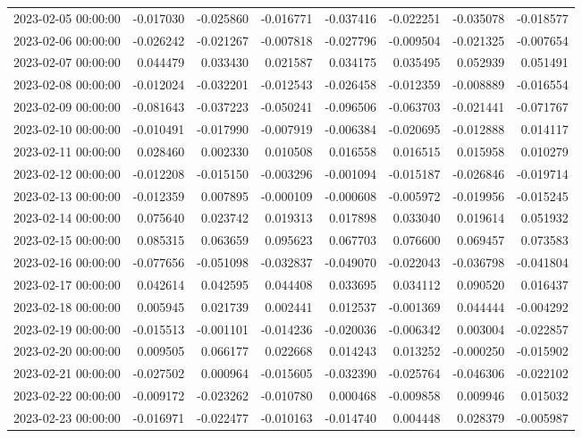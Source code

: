 \begin{tabular}{lrrrrrrr}
2023-02-05 00:00:00 & -0.017030 & -0.025860 & -0.016771 & -0.037416 & -0.022251 & -0.035078 & -0.018577 \\
2023-02-06 00:00:00 & -0.026242 & -0.021267 & -0.007818 & -0.027796 & -0.009504 & -0.021325 & -0.007654 \\
2023-02-07 00:00:00 & 0.044479 & 0.033430 & 0.021587 & 0.034175 & 0.035495 & 0.052939 & 0.051491 \\
2023-02-08 00:00:00 & -0.012024 & -0.032201 & -0.012543 & -0.026458 & -0.012359 & -0.008889 & -0.016554 \\
2023-02-09 00:00:00 & -0.081643 & -0.037223 & -0.050241 & -0.096506 & -0.063703 & -0.021441 & -0.071767 \\
2023-02-10 00:00:00 & -0.010491 & -0.017990 & -0.007919 & -0.006384 & -0.020695 & -0.012888 & 0.014117 \\
2023-02-11 00:00:00 & 0.028460 & 0.002330 & 0.010508 & 0.016558 & 0.016515 & 0.015958 & 0.010279 \\
2023-02-12 00:00:00 & -0.012208 & -0.015150 & -0.003296 & -0.001094 & -0.015187 & -0.026846 & -0.019714 \\
2023-02-13 00:00:00 & -0.012359 & 0.007895 & -0.000109 & -0.000608 & -0.005972 & -0.019956 & -0.015245 \\
2023-02-14 00:00:00 & 0.075640 & 0.023742 & 0.019313 & 0.017898 & 0.033040 & 0.019614 & 0.051932 \\
2023-02-15 00:00:00 & 0.085315 & 0.063659 & 0.095623 & 0.067703 & 0.076600 & 0.069457 & 0.073583 \\
2023-02-16 00:00:00 & -0.077656 & -0.051098 & -0.032837 & -0.049070 & -0.022043 & -0.036798 & -0.041804 \\
2023-02-17 00:00:00 & 0.042614 & 0.042595 & 0.044408 & 0.033695 & 0.034112 & 0.090520 & 0.016437 \\
2023-02-18 00:00:00 & 0.005945 & 0.021739 & 0.002441 & 0.012537 & -0.001369 & 0.044444 & -0.004292 \\
2023-02-19 00:00:00 & -0.015513 & -0.001101 & -0.014236 & -0.020036 & -0.006342 & 0.003004 & -0.022857 \\
2023-02-20 00:00:00 & 0.009505 & 0.066177 & 0.022668 & 0.014243 & 0.013252 & -0.000250 & -0.015902 \\
2023-02-21 00:00:00 & -0.027502 & 0.000964 & -0.015605 & -0.032390 & -0.025764 & -0.046306 & -0.022102 \\
2023-02-22 00:00:00 & -0.009172 & -0.023262 & -0.010780 & 0.000468 & -0.009858 & 0.009946 & 0.015032 \\
2023-02-23 00:00:00 & -0.016971 & -0.022477 & -0.010163 & -0.014740 & 0.004448 & 0.028379 & -0.005987 \\

\end{tabular}
